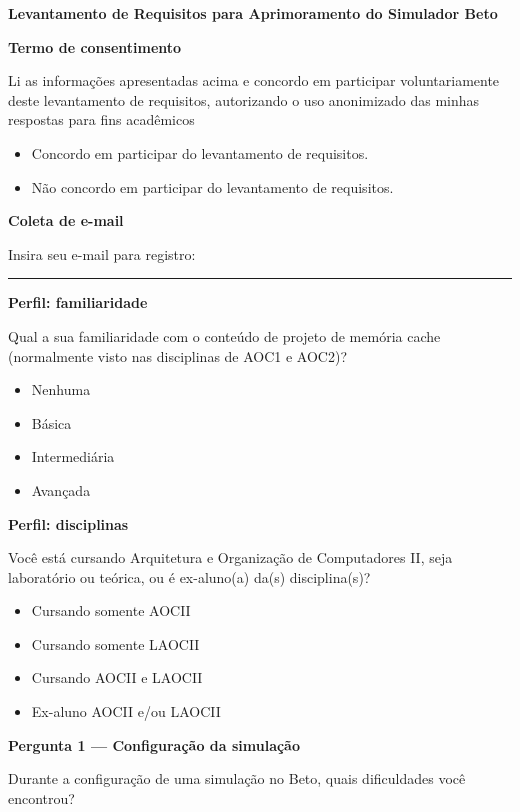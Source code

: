 
\begingroup\small
\noindent\textbf{Levantamento de Requisitos para Aprimoramento do Simulador Beto}

\textbf{Termo de consentimento}\par
Li as informações apresentadas acima e concordo em participar voluntariamente deste levantamento de requisitos, autorizando o uso anonimizado das minhas respostas para fins acadêmicos
\begin{itemize}[label=$\circ$]
\item Concordo em participar do levantamento de requisitos.
\item Não concordo em participar do levantamento de requisitos.
\end{itemize}

\textbf{Coleta de e-mail}\par
Insira seu e-mail para registro: \rule{.6\linewidth}{.3pt}

\textbf{Perfil: familiaridade}\par
Qual a sua familiaridade com o conteúdo de projeto de memória cache (normalmente visto nas disciplinas de AOC1 e AOC2)?
\begin{itemize}[label=$\circ$]
\item Nenhuma
\item Básica
\item Intermediária
\item Avançada
\end{itemize}

\textbf{Perfil: disciplinas}\par
Você está cursando Arquitetura e Organização de Computadores II, seja laboratório ou teórica, ou é ex-aluno(a) da(s) disciplina(s)?
\begin{itemize}[label=$\circ$]
\item Cursando somente AOCII
\item Cursando somente LAOCII
\item Cursando AOCII e LAOCII
\item Ex-aluno AOCII e/ou LAOCII
\end{itemize}

\textbf{Pergunta 1 --- Configuração da simulação}\par
Durante a configuração de uma simulação no Beto, quais dificuldades você encontrou?

